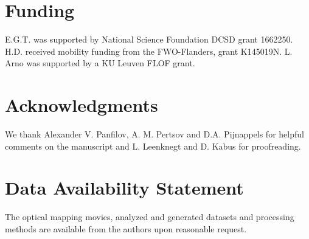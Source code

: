 \documentclass{article}
\begin{document}
\section*{Funding}
E.G.T. was supported by National Science Foundation DCSD grant 1662250. H.D. received mobility funding from the FWO-Flanders, grant K145019N. L. Arno was supported by a KU Leuven FLOF grant.

\section*{Acknowledgments}
We thank Alexander V. Panfilov, A. M. Pertsov and D.A. Pijnappels for helpful comments on the manuscript and L. Leenknegt and D. Kabus for proofreading. 

\section*{Data Availability Statement}
The optical mapping movies, analyzed and generated datasets and processing methods are available from the authors upon reasonable request.


%
%
\end{document}
